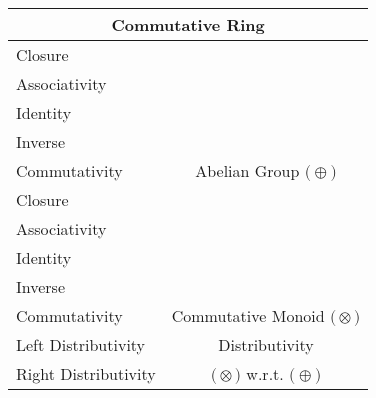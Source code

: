 \documentclass[a4paper,12pt]{scrartcl}
\newcommand{\OpA}{\otimes}
\newcommand{\OpB}{\oplus}
\begin{document}
\begin{minipage}[c]{0,5\textwidth}

\begin{tabular}{|l|c|} %
  \hline
  \multicolumn{2}{c}{\cellcolor{green!25}Commutative Ring} \\
  \hline
    \cellcolor{blue!25} Closure& \cellcolor{yellow!25}  \\
    \cellcolor{blue!25} Associativity& \cellcolor{yellow!25}  \\
    \cellcolor{blue!25} Identity& \cellcolor{yellow!25} \\
    \cellcolor{blue!25} Inverse& \cellcolor{yellow!25} \\
    \cellcolor{blue!25} Commutativity& \multirow{-5}{*}{\tiny\cellcolor{yellow!25}Abelian Group $\big(\OpB\big)$} \\
   \hline
    \cellcolor{blue!25} Closure& \cellcolor{yellow!25}  \\
    \cellcolor{blue!25} Associativity& \cellcolor{yellow!25}  \\
    \cellcolor{blue!25} Identity& \cellcolor{yellow!25} \\
    \cellcolor{red!25} Inverse& \cellcolor{yellow!25} \\
    \cellcolor{blue!25} Commutativity& \multirow{-5}{*}{\cellcolor{yellow!25}\tiny Commutative Monoid $\big(\OpA\big)$} \\
  \hline
  	\cellcolor{blue!25} Left Distributivity&  \tiny\cellcolor{yellow!25}Distributivity\\
    \cellcolor{blue!25} Right Distributivity & \tiny\cellcolor{yellow!25} $\big(\OpA\big)$ w.r.t. $\big(\OpB\big)$  \\
   \hline
\end{tabular}


\end{minipage}
\end{document}
